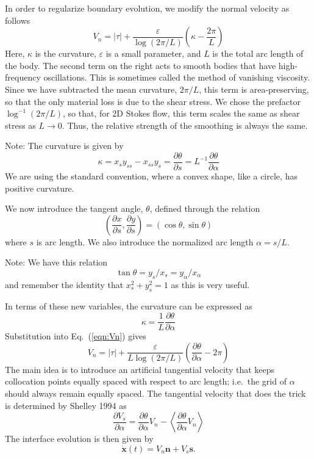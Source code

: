 \documentclass[11pt]{article}
\newcommand{\pd}[2]    { \frac{\partial #1} {\partial #2} }
\newcommand{\abs}[1]{\left| #1 \right|}
\newcommand{\mean}[1]{\left< #1 \right>}
\newcommand{\eps}{\varepsilon}
\newcommand{\atau}{\abs{\tau}}
\newcommand{\xx}{{\mathbf{x}}}
\renewcommand{\ss}{{\mathbf{s}}}
\newcommand{\nn}{{\mathbf{n}}}
\newcommand{\pderiv}[2]{\frac{\partial #1}{\partial #2}}
\newcommand{\Vn}{V_n}
\newcommand{\Vs}{V_s}
\newcommand{\thalpha}{\pderiv{\theta}{\alpha}}
\begin{document}
In order to regularize boundary evolution, we modify the normal velocity as follows
\begin{equation}
\label{eqn:Vn}
\Vn = \atau + \frac{\eps}{\log \left(2\pi/L \right)} \left(\kappa - \frac{2 \pi}{L} \right)
\end{equation}
Here, $\kappa$ is the curvature, $\eps$ is a small parameter, and $L$ is the total arc length of the body. The second term on the right acts to smooth bodies that have high-frequency oscillations. This is sometimes called the method of vanishing viscosity. Since we have subtracted the mean curvature, $2\pi/L$, this term is area-preserving, so that the only material loss is due to the shear stress. We chose the prefactor $\log^{-1} \left(2\pi/L \right)$, so that, for 2D Stokes flow, this term scales the same as shear stress as $L \to 0$. Thus, the relative strength of the smoothing is always the same. 


Note: The curvature is given by
\begin{equation}
\kappa = x_s y_{ss} - x_{ss} y_s = \pd{\theta}{s} = L^{-1} \pd{\theta}{\alpha}
\end{equation}
We are using the standard convention, where a convex shape, like a circle, has positive curvature.

We now introduce the tangent angle, $\theta$, defined through the relation
\begin{equation}
\left( \pderiv{x}{s}, \pderiv{y}{s} \right) = \left(\cos \theta, \sin \theta \right)
\end{equation}
where $s$ is arc length. We also introduce the normalized arc length $\alpha = s / L$. 

Note: We have this relation
\begin{equation}
\tan \theta = y_s/x_s = y_\alpha / x_\alpha
\end{equation}
and remember the identity that $x_s^2 + y_s^2 = 1$ as this is very useful.

In terms of these new variables, the curvature can be expressed as
\begin{equation}
\kappa = \frac{1}{L} \pderiv{\theta}{\alpha}
\end{equation}
Substitution into Eq.~(\ref{eqn:Vn}) gives
\begin{equation}
\label{eqn:Vn2}
\Vn = \atau + \frac{\eps}{L \log \left(2\pi/L \right)}  \left(\pderiv{\theta}{\alpha} - 2 \pi \right)
\end{equation}
The main idea is to introduce an artificial tangential velocity that keeps collocation points equally spaced with respect to arc length; i.e.~the grid of $\alpha$ should always remain equally spaced. The tangential velocity that does the trick is determined by Shelley 1994 as
\begin{equation}
\pderiv{\Vs}{\alpha} = \thalpha \Vn - \mean{\thalpha \Vn}
\end{equation}
The interface evolution is then given by
\begin{equation}
\dot{\xx}(t) = \Vn \nn + \Vs \ss.
\end{equation}
\end{document}
